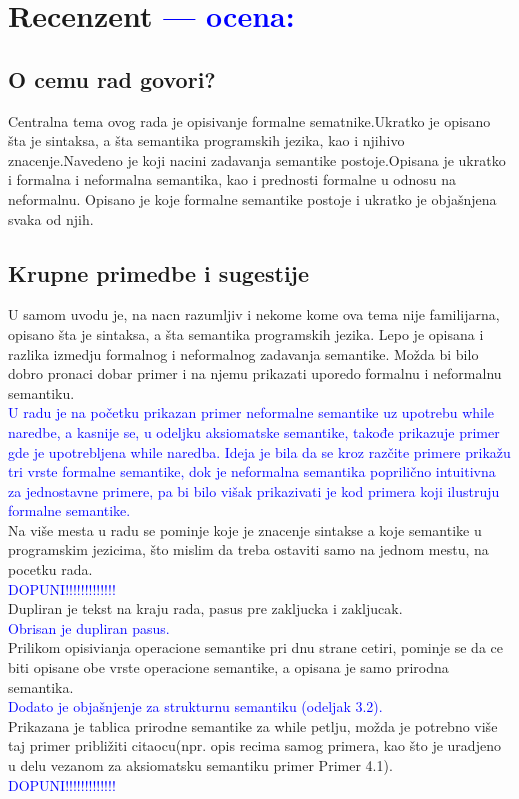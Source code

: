 \documentclass[a4paper]{report}
\newcommand{\odgovor}[1]{\textcolor{blue}{#1}}
\begin{document}
\chapter{Recenzent \odgovor{--- ocena:} }


\section{O cemu rad govori?}

Centralna tema ovog rada je  opisivanje formalne sematnike.Ukratko je opisano šta je sintaksa, a šta semantika programskih jezika, kao i njihivo znacenje.Navedeno je koji nacini zadavanja semantike postoje.Opisana je ukratko i formalna i neformalna semantika, kao i prednosti formalne u odnosu na neformalnu. Opisano je koje formalne semantike postoje i ukratko je objašnjena svaka od njih. 


\section{Krupne primedbe i sugestije}

U samom uvodu je, na nacn razumljiv i nekome kome ova tema nije familijarna, opisano šta je sintaksa, a šta semantika programskih jezika. Lepo je opisana i razlika izmedju formalnog i neformalnog zadavanja semantike. Možda bi bilo dobro pronaci dobar primer i na njemu prikazati uporedo formalnu i neformalnu semantiku.\\
\odgovor{U radu je na početku prikazan primer neformalne semantike uz upotrebu while naredbe, a kasnije se, u odeljku aksiomatske semantike, takođe prikazuje primer gde je upotrebljena while naredba. Ideja je bila da se kroz razčite primere prikažu tri vrste formalne semantike, dok je neformalna semantika poprilično intuitivna za jednostavne primere, pa bi bilo višak prikazivati je kod primera koji ilustruju formalne semantike.}\\
 Na više mesta u radu se pominje koje je znacenje sintakse a koje semantike u programskim jezicima, što mislim da treba ostaviti samo na jednom mestu, na pocetku rada. \\
\odgovor{DOPUNI!!!!!!!!!!!!!}\\
Dupliran je tekst na kraju rada, pasus pre zakljucka i zakljucak. \\
\odgovor{Obrisan je dupliran pasus.}\\
Prilikom opisivianja operacione semantike pri dnu strane cetiri, pominje se da ce biti opisane obe vrste operacione semantike, a opisana je samo prirodna  semantika.\\
\odgovor{Dodato je objašnjenje za strukturnu semantiku (odeljak 3.2).}\\
 Prikazana je tablica prirodne semantike za while petlju, možda je potrebno više taj primer približiti citaocu(npr. opis recima samog primera, kao što je uradjeno u delu vezanom za aksiomatsku semantiku primer Primer 4.1).    
\\
\odgovor{DOPUNI!!!!!!!!!!!!!}\\
\end{document}
